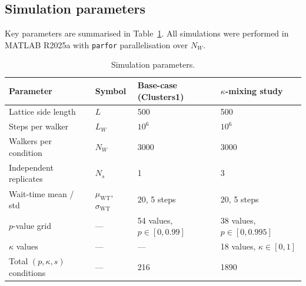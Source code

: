 \subsection{Simulation parameters}

Key parameters are summarised in Table~\ref{tab:params}. All simulations were performed in MATLAB R2025a with \texttt{parfor} parallelisation over $N_W$.

\begin{table}[h]
\centering
\caption{Simulation parameters.}
\label{tab:params}
\begin{tabular}{llll}
\toprule
Parameter & Symbol & Base-case (Clusters1) & $\kappa$-mixing study \\
\midrule
Lattice side length & $L$ & 500 & 500 \\
Steps per walker & $L_W$ & $10^6$ & $10^6$ \\
Walkers per condition & $N_W$ & 3000 & 3000 \\
Independent replicates & $N_s$ & 1 & 3 \\
Wait-time mean / std & $\mu_\mathrm{WT}$, $\sigma_\mathrm{WT}$ & 20, 5 steps & 20, 5 steps \\
$p$-value grid & — & 54 values, $p \in [0, 0.99]$ & 38 values, $p \in [0, 0.995]$ \\
$\kappa$ values & — & — & 18 values, $\kappa \in [0, 1]$ \\
Total $(p,\kappa,s)$ conditions & — & 216 & 1890 \\
\bottomrule
\end{tabular}
\end{table}

